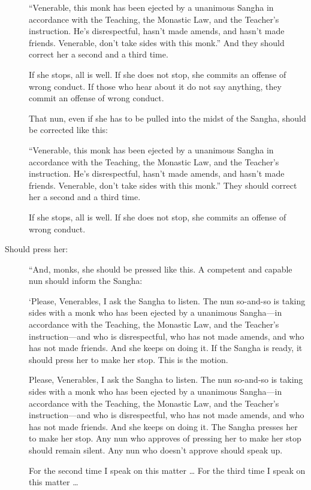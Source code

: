 \documentclass[12pt,openany]{book}%
\begin{document}
\begin{description}
“Venerable, this monk has been ejected by a unanimous Sangha in accordance with the Teaching, the Monastic Law, and the Teacher’s instruction. He’s disrespectful, hasn’t made amends, and hasn’t made friends. Venerable, don’t take sides with this monk.” And they should correct her a second and a third time. 

If she stops, all is well. If she does not stop, she commits an offense of wrong conduct. If those who hear about it do not say anything, they commit an offense of wrong conduct. 

That nun, even if she has to be pulled into the midst of the Sangha, should be corrected like this: 

“Venerable, this monk has been ejected by a unanimous Sangha in accordance with the Teaching, the Monastic Law, and the Teacher’s instruction. He’s disrespectful, hasn’t made amends, and hasn’t made friends. Venerable, don’t take sides with this monk.” They should correct her a second and a third time. 

If she stops, all is well. If she does not stop, she commits an offense of wrong conduct. 

%
\item[Should press her: ] “And, monks, she should be pressed like this. A competent and capable nun should inform the Sangha: 

‘Please, Venerables, I ask the Sangha to listen. The nun so-and-so is taking sides with a monk who has been ejected by a unanimous Sangha—in accordance with the Teaching, the Monastic Law, and the Teacher’s instruction—and who is disrespectful, who has not made amends, and who has not made friends. And she keeps on doing it. If the Sangha is ready, it should press her to make her stop. This is the motion. 

Please, Venerables, I ask the Sangha to listen. The nun so-and-so is taking sides with a monk who has been ejected by a unanimous Sangha—in accordance with the Teaching, the Monastic Law, and the Teacher’s instruction—and who is disrespectful, who has not made amends, and who has not made friends. And she keeps on doing it. The Sangha presses her to make her stop. Any nun who approves of pressing her to make her stop should remain silent. Any nun who doesn’t approve should speak up. 

For the second time I speak on this matter … For the third time I speak on this matter … 


\end{description}
\end{document}
